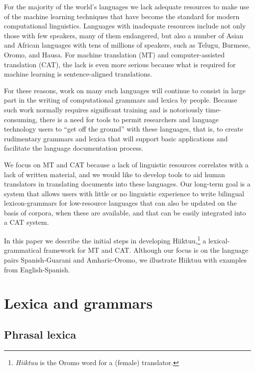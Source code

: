 \documentclass[11pt, a4paper]{article}
\begin{document}
For the majority of the world's languages we lack
adequate resources to make use of the machine learning techniques that
have become the standard for modern computational linguistics.
Languages with inadequate resources include not only those with few
speakers, many of them endangered, but also a number of Asian and African languages with tens of
millions of speakers, such as Telugu, Burmese, Oromo, and Hausa.
For machine translation (MT) and computer-assisted translation (CAT),
the lack is even more serious because what is
required for machine learning is sentence-aligned translations.

For these reasons, work on many such languages will continue to
consist in large part in the writing of computational grammars and
lexica by people.
Because such work normally requires significant training and is
notoriously time-consuming, there is a need for tools to permit
researchers and language technology users to ``get off the ground''
with these languages, that is, to create rudimentary grammars and lexica that
will support basic applications and facilitate the language documentation process.

We focus on MT and CAT because a lack of linguistic resources correlates with a lack of written material, and
we would like to develop tools to aid human translators in translating documents into these languages.
Our long-term goal is a system that allows users with little or no linguistic experience
to write bilingual lexicon-grammars
for low-resource languages that can also be updated on the basis of corpora,
when these are available, and that can be easily integrated into a CAT system.

In this paper we describe the initial steps in developing Hiiktuu,\footnote{\textit{Hiiktuu} is the Oromo
word for a (female) translator.} a lexical-grammatical framework for MT and CAT.
Although our focus is on the language pairs Spanish-Guarani and Amharic-Oromo, we illustrate
Hiiktuu with examples from English-Spanish.

\section{Lexica and grammars}

\subsection{Phrasal lexica}
\label{subsect:phrase}
\end{document}
